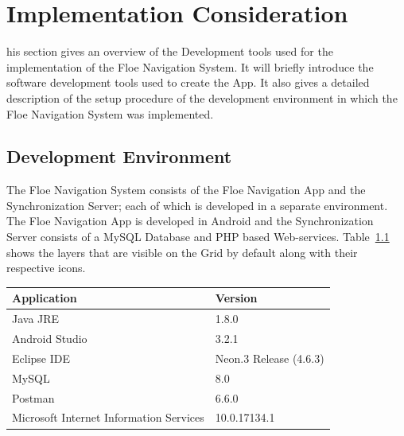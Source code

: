 %
%
\let\textcircled=\pgftextcircled
\chapter{Implementation Consideration}
\label{chap:implementationConsideration}
\noindent
{}his section gives an overview of the Development tools used for the implementation of the Floe Navigation System. It will briefly introduce the software development tools used to create the App. It also gives a detailed description of the setup procedure of the development environment in which the Floe Navigation System was implemented. 
%
%
\section{Development Environment}
\label{sec:sec6_1}
\noindent
%
The Floe Navigation System consists of the Floe Navigation App and the Synchronization Server; each of which is developed in a separate environment. The Floe Navigation App is developed in Android and the Synchronization Server consists of a MySQL Database and PHP based Web-services.
Table~\ref{tbl:CH6applicationsUsed} shows the layers that are visible on the Grid by default along with their respective icons.
%
\begin{table}[!htbp]
	\centering
	\begin{tabular}{ |m{7.5cm}| m{2.5cm} | }
		\hline
		\textbf{Application}  &  \textbf{Version}\footnotemark[1]  \\
		\hline
		Java JRE&1.8.0\textunderscore52
		\\ \hline
		Android Studio&3.2.1
		\\ \hline
		Eclipse IDE\footnotemark[2]&Neon.3 Release (4.6.3)
		\\ \hline
		MySQL\footnotemark[2]&8.0
		\\ \hline
		Postman\footnotemark[2]&6.6.0 
		\\ \hline
		Microsoft Internet Information Services\footnotemark[2]&10.0.17134.1
		\\ \hline
		
	\end{tabular}
	\label{tbl:CH6applicationsUsed}
\end{table}
%
